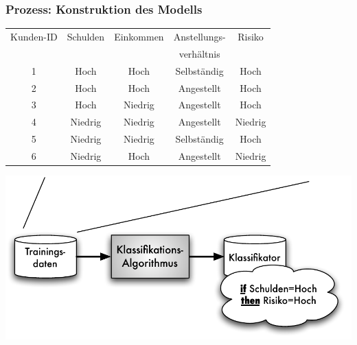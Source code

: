 \begin{frame}
\frametitle{Prozess: Konstruktion des Modells}

\begin{center}
{\tiny\begin{tabular}{|c|c|c|c|c|}
\hline
Kunden-ID & Schulden & Einkommen & Anstellungs- & Risiko \\
           &           &            & verhältnis   &  \\
\hline\hline
1 & Hoch & Hoch & Selbständig & Hoch \\
2 & Hoch & Hoch & Angestellt & Hoch \\
3 & Hoch & Niedrig & Angestellt & Hoch \\
4 & Niedrig & Niedrig & Angestellt & Niedrig \\
5 & Niedrig & Niedrig & Selbständig & Hoch \\
6 & Niedrig & Hoch & Angestellt & Niedrig \\
\hline
\end{tabular}}
\end{center}
\begin{center}
\includegraphics[scale=.6]{fig7/klass-prinzip-modell.pdf}
\end{center}


\end{frame}


